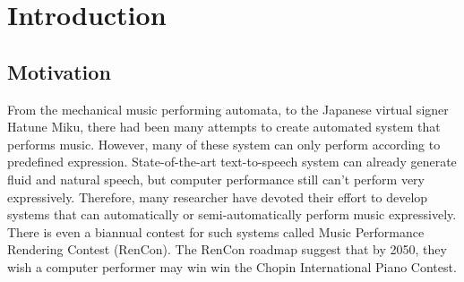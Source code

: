\chapter{Introduction}
\section{Motivation}
From the mechanical music performing automata, to the Japanese virtual signer Hatune Miku, there had been many attempts to create automated system that performs music. However, many of these system can only perform according to predefined expression. State-of-the-art text-to-speech system can already generate fluid and natural speech, but computer performance still can't perform very expressively. Therefore, many researcher have devoted their effort to develop systems that can automatically or semi-automatically perform music expressively. There is even a biannual contest for such systems called Music Performance Rendering Contest (RenCon)\cite{RenCon}. The RenCon roadmap suggest that by 2050, they wish a computer performer may win win the Chopin International Piano Contest.


